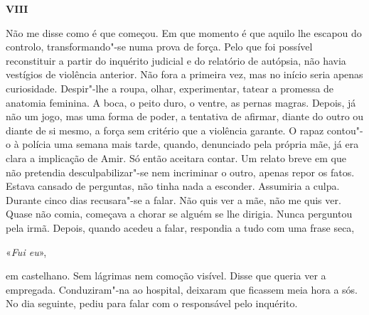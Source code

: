 \pagebreak

\vspace*{1.8cm}
\noindent{}\textbf{VIII}

\bigskip

Não me disse como é que começou. Em que momento é que aquilo lhe escapou
do controlo, transformando"-se numa prova de força. Pelo que foi
possível reconstituir a partir do inquérito judicial e do relatório de
autópsia, não havia vestígios de violência anterior. Não fora a primeira
vez, mas no início seria apenas curiosidade. Despir"-lhe a roupa, olhar,
experimentar, tatear a promessa de anatomia feminina. A boca, o peito
duro, o ventre, as pernas magras. Depois, já não um jogo, mas uma forma
de poder, a tentativa de afirmar, diante do outro ou diante de si mesmo,
a força sem critério que a violência garante. O rapaz contou"-o à
polícia uma semana mais tarde, quando, denunciado pela própria mãe, já
era clara a implicação de Amir. Só então aceitara contar. Um relato
breve em que não pretendia desculpabilizar"-se nem incriminar o outro,
apenas repor os fatos. Estava cansado de perguntas, não tinha nada a
esconder. Assumiria a culpa. Durante cinco dias recusara"-se a falar.
Não quis ver a mãe, não me quis ver. Quase não comia, começava a chorar
se alguém se lhe dirigia. Nunca perguntou pela irmã. Depois, quando
acedeu a falar, respondia a tudo com uma frase seca,

«\emph{Fui eu}»,

em castelhano. Sem lágrimas nem comoção visível. Disse que queria ver a
empregada. Conduziram"-na ao hospital, deixaram que ficassem meia hora a
sós. No dia seguinte, pediu para falar com o responsável pelo inquérito.

